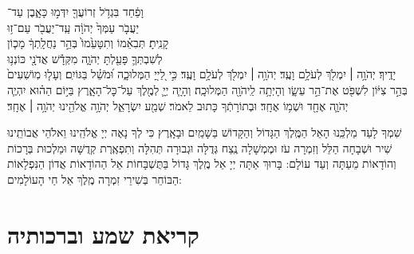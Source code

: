 \documentclass[twoside, openany, parskip=half, 11pt]{book}
\begin{document}
וָפַ֔חַד \hfill בִּגְדֹ֥ל זְרוֹעֲךָ֖ יִדְּמ֣וּ כָּאָ֑בֶן \hfill עַד־ \\
יַעֲבֹ֤ר עַמְּךָ֙ יְהֹוָ֔ה \hfill עַֽד־יַעֲבֹ֖ר עַם־ז֥וּ \\
קָנִֽיתָ׃ \hfill  תְּבִאֵ֗מוֹ וְתִטָּעֵ֙מוֹ֙ בְּהַ֣ר נַחֲלָֽתְךָ֔ \hfill מָכ֧וֹן \\
לְשִׁבְתְּךָ֛ פָּעַ֖לְתָּ יְהֹוָ֑ה \hfill מִקְּדָ֕שׁ אֲדֹנָ֖י כּוֹנְנ֥וּ \\
יָדֶֽיךָ׃ \hfill יְהֹוָ֥ה ׀ יִמְלֹ֖ךְ לְעֹלָ֥ם וָעֶֽד׃\hfill \break
יְהֹוָ֥ה ׀ יִמְלֹ֖ךְ לְעֹלָ֥ם וָעֶֽד׃
כִּ֣י לַ֭ייָ֭ הַמְּלוּכָ֑ה וּ֝מֹשֵׁ֗ל בַּגּוֹיִֽם׃
וְעָל֤וּ מֽוֹשִׁעִים֙ בְּהַ֣ר צִיּ֔וֹן לִשְׁפֹּ֖ט אֶת־הַ֣ר עֵשָׂ֑ו וְהָיְתָ֥ה לַֽיהֹוָ֖ה הַמְּלוּכָֽה׃
וְהָיָ֧ה יְיָ֛ לְמֶ֖לֶךְ עַל־כׇּל־הָאָ֑רֶץ בַּיּ֣וֹם הַה֗וּא יִהְיֶ֧ה יְהֹוָ֛ה אֶחָ֖ד וּשְׁמ֥וֹ אֶחָֽד׃
 וּבְתוֹרָתְֿךָ כָּתוּב לֵאמֹר׃
שְׁמַ֖ע יִשְׂרָאֵ֑ל יְהֹוָ֥ה אֱלֹהֵ֖ינוּ יְהֹוָ֥ה ׀ אֶחָֽד׃


 שִׁמְךָ לָעַד מַלְכֵּֽנוּ הָאֵל הַמֶּֽלֶךְ הַגָּדוֹל וְהַקָּדוֹשׁ בַּשָׁמַֽיִם וּבָאָֽרֶץ כִּי לְךָ נָאֶה יְיָ אֱלֹהֵֽינוּ וֵאלֹהֵי אֲבוֹתֵֽינוּ שִׁיר וּשְׁבָחָה הַלֵּל וְזִמְרָה עֹז וּמֶמְשָׁלָה נֶֽצַח גְּדֻלָּה וּגְבוּרָה תְּהִלָּה וְתִפְאֶֽרֶת קְדֻשָּׁה וּמַלְכוּת בְּרָכוֹת וְהוֹדָאוֹת מֵעַתָּה וְעַד עוֹלָם: בָּרוּךְ אַתָּה יְיָ אֵל מֶֽלֶךְ גָּדוֹל  בַּתֻּשְׁבָּחוֹת אֵל הַהוֹדָאוֹת אֲדוֹן הַנִּפְלָאוֹת הַבּוֹחֵר בְּשִׁירֵי זִמְרָה מֶֽלֶךְ אֵל חַי הָעוֹלָמִים:

\halfkaddish

\enlargethispage{\baselineskip}

\vspace{1.25\baselineskip}
{\let\clearpage\relax
\chapter[שחרית לחול]{קריאת שמע וברכותיה}}
\end{document}
